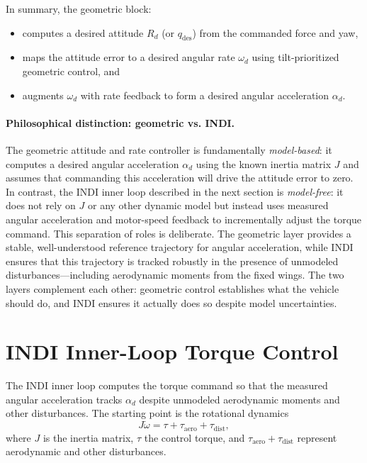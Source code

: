 In summary, the geometric block:
\begin{itemize}
    \item computes a desired attitude $R_d$ (or $q_{\mathrm{des}}$) from the
          commanded force and yaw,
    \item maps the attitude error to a desired angular rate $\omega_d$ using
          tilt-prioritized geometric control, and
    \item augments $\omega_d$ with rate feedback to form a desired angular
          acceleration $\alpha_d$.
\end{itemize}

\paragraph{Philosophical distinction: geometric vs. INDI.}
The geometric attitude and rate controller is fundamentally \emph{model-based}: it computes a desired angular acceleration $\alpha_d$ using the known inertia matrix $J$ and assumes that commanding this acceleration will drive the attitude error to zero. In contrast, the INDI inner loop described in the next section is \emph{model-free}: it does not rely on $J$ or any other dynamic model but instead uses measured angular acceleration and motor-speed feedback to incrementally adjust the torque command. This separation of roles is deliberate. The geometric layer provides a stable, well-understood reference trajectory for angular acceleration, while INDI ensures that this trajectory is tracked robustly in the presence of unmodeled disturbances---including aerodynamic moments from the fixed wings. The two layers complement each other: geometric control establishes what the vehicle should do, and INDI ensures it actually does so despite model uncertainties.

\section{INDI Inner-Loop Torque Control}

The INDI inner loop computes the torque command so that the measured angular
acceleration tracks $\alpha_d$ despite unmodeled aerodynamic moments and other
disturbances. The starting point is the rotational dynamics
\begin{equation}
    J \dot{\omega} = \tau + \tau_{\mathrm{aero}} + \tau_{\mathrm{dist}},
\end{equation}
where $J$ is the inertia matrix, $\tau$ the control torque, and
$\tau_{\mathrm{aero}} + \tau_{\mathrm{dist}}$ represent aerodynamic and other
disturbances.

